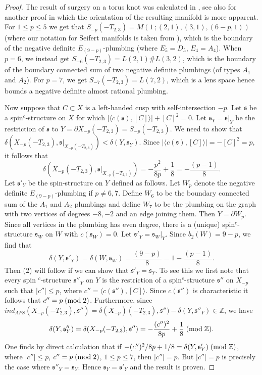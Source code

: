 \documentclass{amsart}
\theoremstyle{definition}
\theoremstyle{remark}
\numberwithin{equation}{section}
\begin{document}
\begin{proof}
The result of surgery on a torus knot was calculated in \cite{mo}, see also \cite{kash} for another proof in which the orientation of the resulting manifold is more apparent. For $1 \le p \le 5$ we get that $S_{-p}(-T_{2,3}) = M( 1 \, ; (2,1) , (3,1) , (6-p , 1))$ (where our notation for Seifert manifolds is taken from \cite[.4]{sav}), which is the boundary of the negative definite $E_{(9-p)}$-plumbing (where $E_5 = D_5$, $E_4 = A_4$). When $p=6$, we instead get $S_{-6}(-T_{2,3}) = L(2,1) \# L(3,2)$, which is the boundary of the boundary connected sum of two negative definite plumbings (of types $A_1$ and $A_2$). For $p=7$, we get $S_{-7}(-T_{2,3}) = L(7,2)$, which is a lens space hence bounds a negative definite almost rational plumbing.

Now suppose that $C \subset X$ is a left-handed cusp with self-intersection $-p$. Let $\mathfrak{s}$ be a spin$^c$-structure on $X$ for which $| \langle c(\mathfrak{s}) , [C] \rangle | + [C]^2 = 0$. Let $\mathfrak{s}_Y = \mathfrak{s}|_Y$ be the restriction of $\mathfrak{s}$ to $Y = \partial X_{-p}(-T_{2,3}) = S_{-p}(-T_{2,3})$. We need to show that $\delta( X_{-p}(-T_{2,3}) , \mathfrak{s}|_{X_{-p}(-T_{2,3})} ) < \delta( Y , \mathfrak{s}_Y)$. Since $| \langle c(\mathfrak{s}) , [C] \rangle | = -[C]^2 = p$, it follows that 
\[
\delta( X_{-p}(-T_{2,3}) , \mathfrak{s}|_{X_{-p}(-T_{2,3})} ) = -\frac{p^2}{8p} + \frac{1}{8} = -\frac{(p-1)}{8}.
\]
Let $\mathfrak{s}'_Y$ be the spin-structure on $Y$ defined as follows. Let $W_p$ denote the negative definite $E_{(9-p)}$-plumbing if $p \neq 6,7$. Define $W_6$ to be the boundary connected sum of the $A_1$ and $A_2$ plumbings and define $W_7$ to be the plumbing on the graph with two vertices of degrees $-8,-2$ and an edge joining them. Then $Y = \partial W_p$. Since all vertices in the plumbing has even degree, there is a (unique) spin$^c$-structure $\mathfrak{s}_W$ on $W$ with $c( \mathfrak{s}_W) = 0$. Let $\mathfrak{s}'_Y = \mathfrak{s}_W |_Y$. Since $b_2(W) = 9-p$, we find that
\[
\delta( Y , \mathfrak{s}'_Y ) = \delta(W , \mathfrak{s}_W) = \frac{(9-p)}{8} = 1 - \frac{(p-1)}{8}.
\]
Then (2) will follow if we can show that $\mathfrak{s}'_Y = \mathfrak{s}_Y$. To see this we first note that every spin $^c$-structure $\mathfrak{s}''_Y$ on $Y$ is the restriction of a spin$^c$-structure $\mathfrak{s}''$ on $X_{-p}$ such that $|c''| \le p$, where $c'' = \langle c(\mathfrak{s}'') , [C] \rangle$. Since $c(\mathfrak{s}'')$ is characteristic it follows that $c'' = p \; ({\rm mod} \; 2)$. Furthermore, since $ind_{APS}( X_{-p}(-T_{2,3}) , \mathfrak{s}'') = \delta( X_{-p})(-T_{2,3}) , \mathfrak{s}'') - \delta(Y , \mathfrak{s}''_Y) \in \mathbb{Z}$, we have
\[
\delta(Y , \mathfrak{s}''_Y) = \delta(X_{-p}(-T_{2,3}) , \mathfrak{s}'') = -\frac{(c'')^2}{8p} + \frac{1}{8} \; ({\rm mod} \; \mathbb{Z}).
\]
One finds by direct calculation that if $-(c'')^2/8p + 1/8 = \delta(Y , \mathfrak{s}'_Y) \; ({\rm mod} \; \mathbb{Z})$, where $|c''| \le p$, $c'' = p \; ({\rm mod} \; 2)$, $1 \le p \le 7$, then $|c''| = p$. But $|c''| = p$ is precisely the case where $\mathfrak{s}''_Y = \mathfrak{s}_Y$. Hence $\mathfrak{s}_Y = \mathfrak{s}'_Y$ and the result is proven.
\end{proof}
\end{document}
